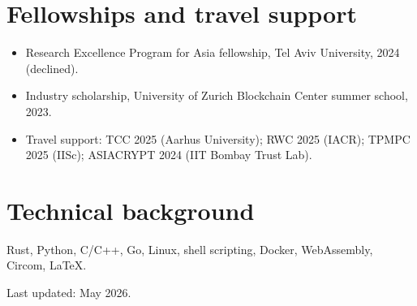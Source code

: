 \documentclass[10pt,a4paper]{article}
\begin{document}
\section*{Fellowships and travel support}
\begin{itemize}
  \item Research Excellence Program for Asia fellowship, Tel Aviv University, 2024 (declined).
  \item Industry scholarship, University of Zurich Blockchain Center summer school, 2023.
  \item Travel support: TCC 2025 (Aarhus University); RWC 2025 (IACR); TPMPC 2025 (IISc); ASIACRYPT 2024 (IIT Bombay Trust Lab).
\end{itemize}

\section*{Technical background}
Rust, Python, C/C++, Go, Linux, shell scripting, Docker, WebAssembly, Circom, LaTeX.

\vfill
{\footnotesize Last updated: May 2026.}
\end{document}
